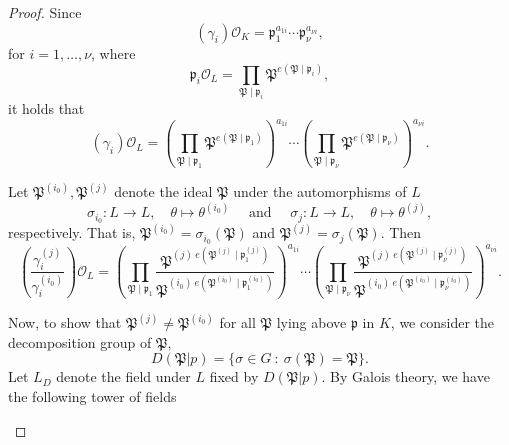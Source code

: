 \begin{proof}
Since 
\[(\gamma_i)\mathcal{O}_K = \mathfrak{p}_1^{a_{1i}} \cdots \mathfrak{p}_{\nu}^{a_{\nu i}},\]
for $i = 1, \dots, \nu$, where
\[\mathfrak{p}_i\mathcal{O}_L=\prod_{\mathfrak{P}\mid\mathfrak{p}_i} \mathfrak{P}^{e(\mathfrak{P}\mid\mathfrak{p}_i)},\]
it holds that
\[(\gamma_i)\mathcal{O}_L = \left(\prod_{\mathfrak{P}\mid\mathfrak{p}_1} \mathfrak{P}^{e(\mathfrak{P}\mid\mathfrak{p}_1)}\right)^{a_{1i}} \cdots \left(\prod_{\mathfrak{P}\mid\mathfrak{p}_{\nu}} \mathfrak{P}^{e(\mathfrak{P}\mid\mathfrak{p}_{\nu})}\right)^{a_{\nu i}}.\]

Let $\mathfrak{P}^{(i_0)},\mathfrak{P}^{(j)}$ denote the ideal $\mathfrak{P}$ under the automorphisms of $L$
\[\sigma_{i_0}: L \to L, \quad \theta \mapsto \theta^{(i_0)} \quad \text{ and } \quad \sigma_{j}: L \to L, \quad \theta \mapsto \theta^{(j)},\]
respectively. That is, $\mathfrak{P}^{(i_0)} = \sigma_{i_0}(\mathfrak{P})$ and $\mathfrak{P}^{(j)} = \sigma_{j}(\mathfrak{P})$. Then
\[\left( \frac{\gamma_i^{(j)}}{\gamma_i^{(i_0)}}\right)\mathcal{O}_L 
	 = \left(\prod_{\mathfrak{P}\mid\mathfrak{p}_1} \frac{\mathfrak{P}^{(j) \ e(\mathfrak{P}^{(j)}\mid\mathfrak{p}_1^{(j)})}}{\mathfrak{P}^{(i_0) \ e(\mathfrak{P}^{(i_0)}\mid\mathfrak{p}^{(i_0)}_1)}}\right)^{a_{1i}} \cdots \left(\prod_{\mathfrak{P}\mid\mathfrak{p}_{\nu}} \frac{\mathfrak{P}^{(j) \ e(\mathfrak{P}^{(j)}\mid\mathfrak{p}^{(j)}_{\nu})}}{\mathfrak{P}^{(i_0) \ e(\mathfrak{P}^{(i_0)}\mid\mathfrak{p}^{(i_0)}_{\nu})}}\right)^{a_{\nu i}}.\]

Now, to show that $\mathfrak{P}^{(j)} \neq \mathfrak{P}^{(i_0)}$ for all $\mathfrak{P}$ lying above $\mathfrak{p}$ in $K$, we consider the decomposition group of $\mathfrak{P}$, 
\[D(\mathfrak{P}|p) = \{\sigma \in G \ : \ \sigma(\mathfrak{P}) = \mathfrak{P}\}.\]
Let $L_D$ denote the field under $L$ fixed by $D(\mathfrak{P}|p)$. By Galois theory, we have the following tower of fields

\begin{center}
\end{center}


\end{proof}

